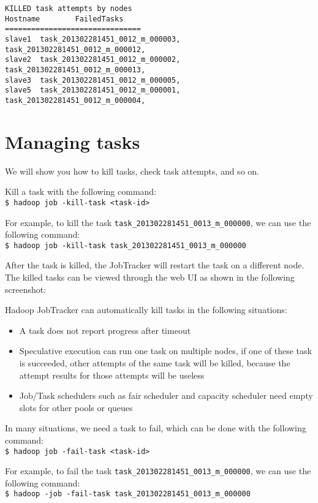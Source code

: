 \begin{verbatim}
KILLED task attempts by nodes
Hostname        FailedTasks
===============================
slave1  task_201302281451_0012_m_000003, task_201302281451_0012_m_000012,
slave2  task_201302281451_0012_m_000002, task_201302281451_0012_m_000013,
slave3  task_201302281451_0012_m_000005,
slave5  task_201302281451_0012_m_000001, task_201302281451_0012_m_000004,
\end{verbatim}

\section{Managing tasks}
We will show you how to kill tasks, check task attempts, and so on. 

Kill a task with the following command: \\
\verb|$ hadoop job -kill-task <task-id> |

For example, to kill the task \verb|task_201302281451_0013_m_000000|, we can use the following command: \\ 
\verb|$ hadoop job -kill-task task_201302281451_0013_m_000000|

After the task is killed, the JobTracker will restart the task on a different node. The killed tasks can be viewed through the web UI as shown in the following screenshot:


Hadoop JobTracker can automatically kill tasks in the following situations:
\begin{itemize}
  \item A task does not report progress after timeout
  \item Speculative execution can run one task on multiple nodes, if one of these task is succeeded, other attempts of the same task will be killed, because the attempt results for those attempts will be useless
  \item Job/Task schedulers such as fair scheduler and capacity scheduler need empty slots for other pools or queues
\end{itemize}

In many situations, we need a task to fail, which can be done with the following command: \\
\verb|$ hadoop job -fail-task <task-id> |

For example, to fail the task \verb|task_201302281451_0013_m_000000|, we can use the following command: \\ 
\verb|$ hadoop -job -fail-task task_201302281451_0013_m_000000|

